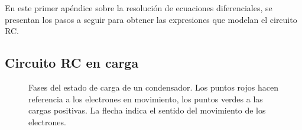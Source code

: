 \documentclass[../main.tex]{subfiles}
\begin{document}
En este primer apéndice sobre la resolución de ecuaciones diferenciales, se presentan los pasos a seguir para obtener las expresiones que modelan el circuito RC. \\

\subsection{Circuito RC en carga}

\begin{figure}[!h]
    \centering
    \caption{Fases del estado de carga de un condensador. Los puntos rojos hacen referencia a los electrones en movimiento, los puntos verdes a las cargas positivas. La flecha indica el sentido del movimiento de los electrones.}
    \label{fig::carga_condensador_2}
\end{figure}
\end{document}
